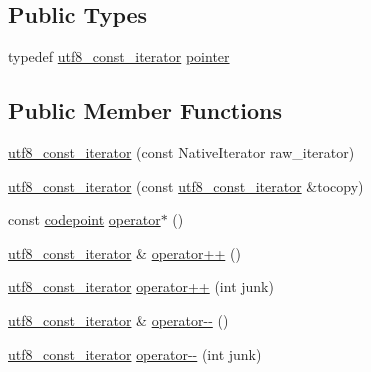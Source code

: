\subsection*{Public Types}
\begin{DoxyCompactItemize}
\item 
typedef \hyperlink{classu5e_1_1utf8__const__iterator}{utf8\+\_\+const\+\_\+iterator} \hyperlink{classu5e_1_1utf8__const__iterator_ab8b6bc6c6b56d00ff1a8b9a896be6f3f}{pointer}
\end{DoxyCompactItemize}
\subsection*{Public Member Functions}
\begin{DoxyCompactItemize}
\item 
\hyperlink{classu5e_1_1utf8__const__iterator_a63fa9eebf92db15410ba8864208ebb82}{utf8\+\_\+const\+\_\+iterator} (const Native\+Iterator raw\+\_\+iterator)
\item 
\hyperlink{classu5e_1_1utf8__const__iterator_a7beaaaf0bf9784170014b868e060b091}{utf8\+\_\+const\+\_\+iterator} (const \hyperlink{classu5e_1_1utf8__const__iterator}{utf8\+\_\+const\+\_\+iterator} \&tocopy)
\item 
const \hyperlink{classu5e_1_1codepoint}{codepoint} \hyperlink{classu5e_1_1utf8__const__iterator_addd93a5294e3ba66ab82d2ca6f5d87be}{operator$\ast$} ()
\end{DoxyCompactItemize}
{\bf }\par
\begin{DoxyCompactItemize}
\item 
\hyperlink{classu5e_1_1utf8__const__iterator}{utf8\+\_\+const\+\_\+iterator} \& \hyperlink{classu5e_1_1utf8__const__iterator_a6012ac7067df6be5b84cad638cc9b13c}{operator++} ()
\item 
\hyperlink{classu5e_1_1utf8__const__iterator}{utf8\+\_\+const\+\_\+iterator} \hyperlink{classu5e_1_1utf8__const__iterator_a1449b50f26f761993e382bb93a8736db}{operator++} (int junk)
\end{DoxyCompactItemize}

{\bf }\par
\begin{DoxyCompactItemize}
\item 
\hyperlink{classu5e_1_1utf8__const__iterator}{utf8\+\_\+const\+\_\+iterator} \& \hyperlink{classu5e_1_1utf8__const__iterator_a5fdcd90a37a0aa4a3444c7b12dc46765}{operator-\/-\/} ()
\item 
\hyperlink{classu5e_1_1utf8__const__iterator}{utf8\+\_\+const\+\_\+iterator} \hyperlink{classu5e_1_1utf8__const__iterator_aefe09be687e582d4132ca3e3ee4b59dd}{operator-\/-\/} (int junk)
\end{DoxyCompactItemize}

